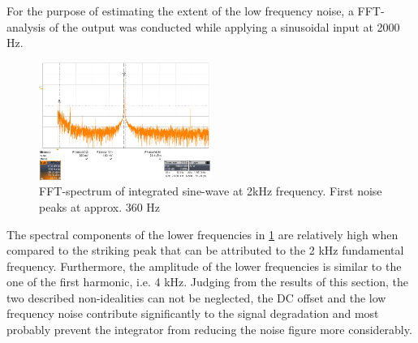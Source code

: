 For the purpose of estimating the extent of the low frequency noise, a FFT-analysis of the output was conducted while applying a sinusoidal input at 2000 Hz.

\begin{figure}[htbp]
 \centering
 \centerline{\includegraphics[width=0.5\textwidth]{figures/Results/Noisespectrum/sin2k-0_02v}}

  \caption[Kurze Abbildungsbeschreibung]{FFT-spectrum of integrated sine-wave at 2kHz frequency. First noise peaks at approx. 360 Hz}
\label{fig.noisefft}
\end{figure}

The spectral components of the lower frequencies in \ref{fig.noisefft} are relatively high when compared to the striking peak that can be attributed to the 2 kHz fundamental frequency.
Furthermore, the amplitude of the lower frequencies is similar to the one of the first harmonic, i.e. 4 kHz.
Judging from the results of this section, the two described non-idealities can not be neglected, the DC offset and the low frequency noise contribute significantly to the signal degradation and
most probably prevent the integrator from reducing the noise figure more considerably.




